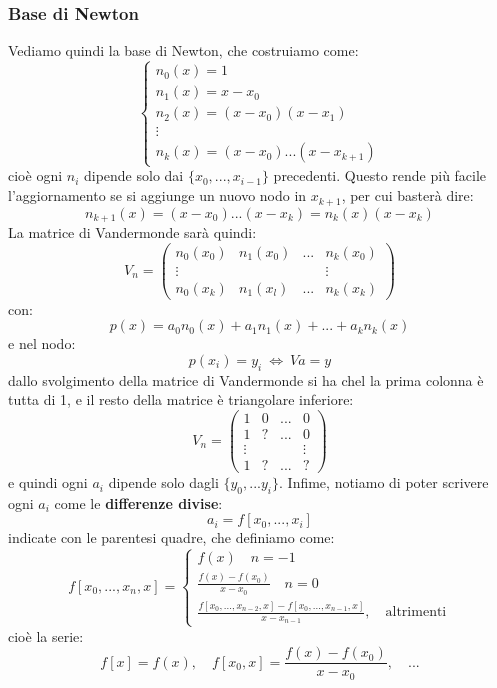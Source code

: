 \documentclass[a4paper,11pt]{article}
\begin{document}
\subsubsection{Base di Newton}
Vediamo quindi la base di Newton, che costruiamo come:
\[
	\begin{cases}
			n_0(x) = 1 \\
			n_1(x) = x - x_0 \\
			n_2(x) = (x - x_0)(x - x_1) \\
			\vdots \\
			n_k(x) = (x - x_0) ... (x - x_{k + 1})
	\end{cases}
\]
cioè ogni $n_i$ dipende solo dai $\{ x_0, ..., x_{i - 1} \}$ precedenti.
Questo rende più facile l'aggiornamento se si aggiunge un nuovo nodo in $x_{k + 1}$, per cui basterà dire:
$$
n_{k + 1}(x) = (x - x_0) ... (x - x_k) = n_k(x) (x - x_k)
$$
La matrice di Vandermonde sarà quindi:
$$
V_n =
\begin{pmatrix}
	n_0(x_0) & n_1(x_0) & ... & n_k(x_0) \\ 
	\vdots & & & \vdots \\
	n_0(x_k) & n_1(x_l) & ... & n_k(x_k)
\end{pmatrix}
$$
con:
$$
p(x) = a_0 n_0(x) + a_1 n_1(x) + ... + a_k n_k(x)
$$
e nel nodo:
$$
p(x_i) = y_i \ \Leftrightarrow \ Va = y
$$
dallo svolgimento della matrice di Vandermonde si ha chel la prima colonna è tutta di 1, e il resto della matrice è triangolare inferiore:
$$
V_n =
\begin{pmatrix}
	1 & 0 & ... & 0 \\
	1 & ? & ... & 0 \\
	\vdots & & & \vdots \\
	1 & ? & ... & ?
\end{pmatrix}
$$
e quindi ogni $a_i$ dipende solo dagli $\{ y_0, ... y_i \}$.
Infime, notiamo di poter scrivere ogni $a_i$ come le \textbf{differenze divise}:
$$
a_i = f[x_0, ..., x_i]
$$
indicate con le parentesi quadre, che definiamo come:
$$
f[x_0, ..., x_n, x] =
\begin{cases}
	f(x) \quad n = - 1 \\
	\frac{f(x) - f(x_0)}{x - x_0} \quad n = 0 \\
	\frac{ f[x_0, ..., x_{n - 2}, x] - f[x_0, ..., x_{n-1}, x] }{x - x_{n - 1}}, \quad \text{altrimenti}
\end{cases}
$$
cioè la serie:
$$
f[x] = f(x), \quad f[x_0, x] = \frac{f(x) - f(x_0)}{x - x_0}, \quad ...
$$
\end{document}
